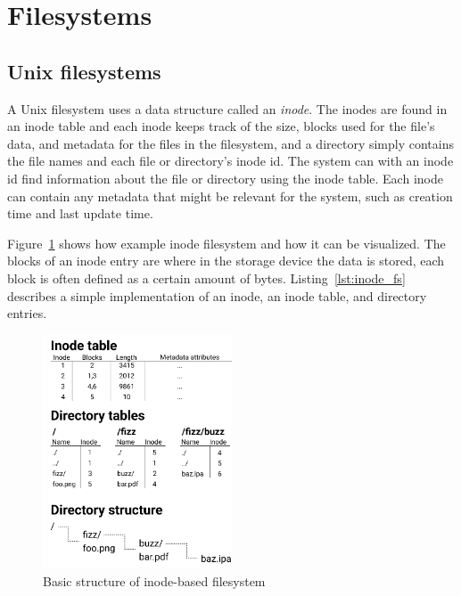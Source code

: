 \section{Filesystems}
\subsection{Unix filesystems}
A Unix filesystem uses a data structure called an \textit{inode}. The inodes are found in an inode table and each inode keeps track of the size, blocks used for the file's data, and metadata for the files in the filesystem, and a directory simply contains the file names and each file or directory's inode id. The system can with an inode id find information about the file or directory using the inode table. Each inode can contain any metadata that might be relevant for the system, such as creation time and last update time. 

Figure~\ref{fig:inode_diag} shows how example inode filesystem and how it can be visualized. The blocks of an inode entry are where in the storage device the data is stored, each block is often defined as a certain amount of bytes. Listing~\ref{lst:inode_fs} describes a simple implementation of an inode, an inode table, and directory entries. 


\begin{figure}[!ht]
	\begin{center}
	  \includegraphics[width=0.5\textwidth]{figures/inode_diagram.png}
	\end{center}
	\caption{Basic structure of inode-based filesystem}
	\label{fig:inode_diag}
\end{figure}

